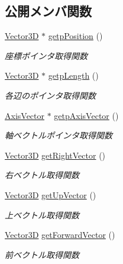 \subsection*{公開メンバ関数}
\begin{DoxyCompactItemize}
\item 
\mbox{\hyperlink{class_vector3_d}{Vector3D}} $\ast$ \mbox{\hyperlink{class_o_b_b_ae2e378f96e4b3899e133ce50b91155a8}{getp\+Position}} ()
\begin{DoxyCompactList}\small\item\em 座標ポインタ取得関数 \end{DoxyCompactList}\item 
\mbox{\hyperlink{class_vector3_d}{Vector3D}} $\ast$ \mbox{\hyperlink{class_o_b_b_a831280fe9affdea9bd5c4c6f28d4a9cc}{getp\+Length}} ()
\begin{DoxyCompactList}\small\item\em 各辺のポインタ取得関数 \end{DoxyCompactList}\item 
\mbox{\hyperlink{class_axis_vector}{Axis\+Vector}} $\ast$ \mbox{\hyperlink{class_o_b_b_a19f4a5e3a412d748cc49f47e1f66faab}{getp\+Axis\+Vector}} ()
\begin{DoxyCompactList}\small\item\em 軸ベクトルポインタ取得関数 \end{DoxyCompactList}\item 
\mbox{\hyperlink{class_vector3_d}{Vector3D}} \mbox{\hyperlink{class_o_b_b_a7879aad21978ea9dfc5f50a608349b27}{get\+Right\+Vector}} ()
\begin{DoxyCompactList}\small\item\em 右ベクトル取得関数 \end{DoxyCompactList}\item 
\mbox{\hyperlink{class_vector3_d}{Vector3D}} \mbox{\hyperlink{class_o_b_b_a73da06fa4dbebb2b59dc3168971c8d5d}{get\+Up\+Vector}} ()
\begin{DoxyCompactList}\small\item\em 上ベクトル取得関数 \end{DoxyCompactList}\item 
\mbox{\hyperlink{class_vector3_d}{Vector3D}} \mbox{\hyperlink{class_o_b_b_a4d839b676caebf6ba4361bb9166e97d3}{get\+Forward\+Vector}} ()
\begin{DoxyCompactList}\small\item\em 前ベクトル取得関数 \end{DoxyCompactList}\item 

\end{DoxyCompactItemize}
